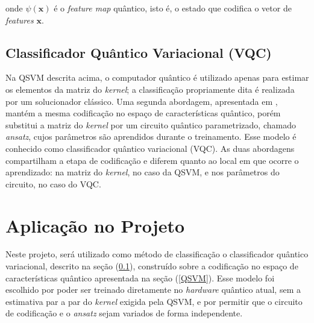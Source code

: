 \noindent onde $\psi(\mathbf{x})$ é o \textit{feature map} quântico, isto é, o estado que codifica o vetor de \textit{features} $\mathbf{x}$.

\subsection{Classificador Quântico Variacional (VQC)} \label{VQC}

Na QSVM descrita acima, o computador quântico é utilizado apenas para estimar os elementos da matriz do \textit{kernel}; a classificação propriamente dita é realizada por um solucionador clássico. Uma segunda abordagem, apresentada em , mantém a mesma codificação no espaço de características quântico, porém substitui a matriz do \textit{kernel} por um circuito quântico parametrizado, chamado \textit{ansatz}, cujos parâmetros são aprendidos durante o treinamento. Esse modelo é conhecido como classificador quântico variacional (VQC). As duas abordagens compartilham a etapa de codificação e diferem quanto ao local em que ocorre o aprendizado: na matriz do \textit{kernel}, no caso da QSVM, e nos parâmetros do circuito, no caso do VQC.

\section{Aplicação no Projeto}

Neste projeto, será utilizado como método de classificação o classificador quântico variacional, descrito na seção (\ref{VQC}), construído sobre a codificação no espaço de características quântico apresentada na seção (\ref{QSVM}). Esse modelo foi escolhido por poder ser treinado diretamente no \textit{hardware} quântico atual, sem a estimativa par a par do \textit{kernel} exigida pela QSVM, e por permitir que o circuito de codificação e o \textit{ansatz} sejam variados de forma independente.